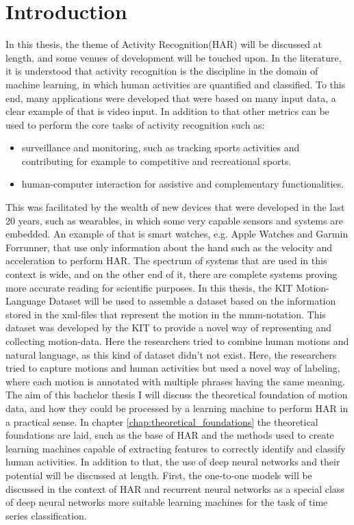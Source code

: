 \chapter{Introduction}
	In this thesis, the theme of Activity Recognition(HAR) will be discussed at length, and some venues of development will be touched upon. In the literature, it is understood that activity recognition is the discipline in the domain of machine learning, in which human activities are quantified and classified. To this end, many applications were developed that were based on many input data, a clear example of that is video input\cite{adeli2014multi}. In addition to that other metrics can be used to perform the core tasks of activity recognition such as:
	\begin{itemize}
		\item surveillance and monitoring, such as tracking sports activities and contributing for example to competitive and recreational sports.
		\item human-computer interaction for assistive and complementary functionalities\cite{adeli2014multi}.
	\end{itemize}
	This was facilitated by the wealth of new devices that were developed in the last 20 years, such as wearables, in which some very capable sensors and systems are embedded. An example of that is smart watches, e.g. Apple Watches and Garmin Forrunner, that use only information about the hand such as the velocity and acceleration to perform HAR. The spectrum of systems that are used in this context is wide, and on the other end of it, there are complete systems proving more accurate reading for scientific purposes\cite{6365160}. In this thesis, the KIT Motion-Language Dataset will be used to assemble a dataset based on the information stored in the xml-files that represent the motion in the mmm-notation. This dataset was developed by the KIT to provide a novel way of representing and collecting motion-data. Here the researchers tried to combine human motions and natural language, as this kind of dataset didn't not exist\cite{Plappert2016}. Here, the researchers tried to capture motions and human activities but used a novel way of labeling, where each motion is annotated with multiple phrases having the same meaning.\newline
	The aim of this bachelor thesis I will discuss the theoretical foundation of motion data, and how they could be processed by a learning machine to perform HAR in a practical sense. In chapter \ref{chap:theoretical_foundations} the theoretical foundations are laid, such as the base of HAR and the methods used to create learning machines capable of extracting features to correctly identify and classify human activities. In addition to that, the use of deep neural networks and their potential will be discussed at length. First, the one-to-one models will be discussed in the context of HAR and recurrent neural networks as a special class of deep neural networks more suitable learning machines for the task of time series classification.\newline
